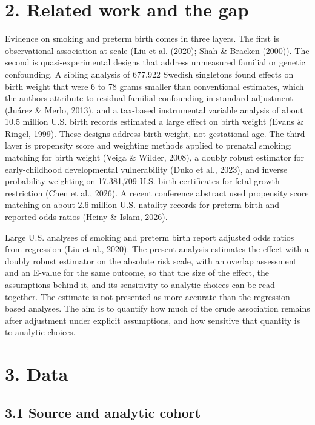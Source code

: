 \documentclass[11pt,letterpaper]{article}
\begin{document}
\section*{2. Related work and the gap}

Evidence on smoking and preterm birth comes in three layers. The first is observational association at scale (Liu et al. (2020); Shah \& Bracken (2000)). The second is quasi-experimental designs that address unmeasured familial or genetic confounding. A sibling analysis of 677,922 Swedish singletons found effects on birth weight that were 6 to 78 grams smaller than conventional estimates, which the authors attribute to residual familial confounding in standard adjustment (Juárez \& Merlo, 2013), and a tax-based instrumental variable analysis of about 10.5 million U.S. birth records estimated a large effect on birth weight (Evans \& Ringel, 1999). These designs address birth weight, not gestational age. The third layer is propensity score and weighting methods applied to prenatal smoking: matching for birth weight (Veiga \& Wilder, 2008), a doubly robust estimator for early-childhood developmental vulnerability (Duko et al., 2023), and inverse probability weighting on 17,381,709 U.S. birth certificates for fetal growth restriction (Chen et al., 2026). A recent conference abstract used propensity score matching on about 2.6 million U.S. natality records for preterm birth and reported odds ratios (Heiny \& Islam, 2026).

Large U.S. analyses of smoking and preterm birth report adjusted odds ratios from regression (Liu et al., 2020). The present analysis estimates the effect with a doubly robust estimator on the absolute risk scale, with an overlap assessment and an E-value for the same outcome, so that the size of the effect, the assumptions behind it, and its sensitivity to analytic choices can be read together. The estimate is not presented as more accurate than the regression-based analyses. The aim is to quantify how much of the crude association remains after adjustment under explicit assumptions, and how sensitive that quantity is to analytic choices.

\section*{3. Data}

\subsection*{3.1 Source and analytic cohort}
\end{document}
